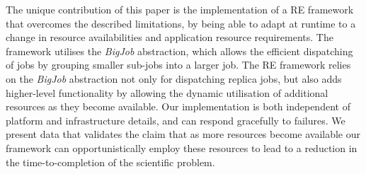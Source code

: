 \documentclass{rspublic}
\newcommand{\alnote}[1]{ {\textcolor{blue} { ***AL: #1 }}}
\newcommand{\jhanote}[1]{ {\textcolor{red} { ***SJ: #1 }}}
\newcommand{\alnote}[1]{}
\newcommand{\jhanote}[1]{}
\begin{document}
The unique contribution of this paper is the implementation of a RE
framework that overcomes the described limitations, by being able to
adapt at runtime to a change in resource availabilities and
application resource requirements. The framework utilises the
\emph{BigJob} abstraction, which %
allows the efficient dispatching of jobs by grouping smaller sub-jobs
into a larger job. 
The RE framework relies on the \emph{BigJob} abstraction not only for
dispatching replica jobs, but also adds higher-level functionality by
allowing the dynamic utilisation of additional resources as they
become available.  Our implementation is both independent of 
platform and infrastructure details, and can respond gracefully to
failures.  We present data that validates the claim that as more
resources become available our framework can opportunistically employ
these resources to lead to a reduction in the time-to-completion of
the scientific problem.  

\end{document}

